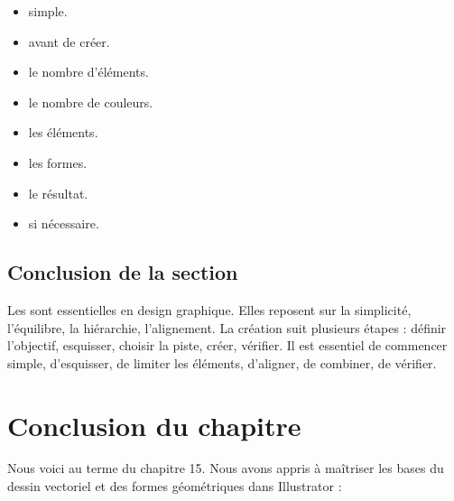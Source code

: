 \begin{itemize}
    \item {} simple.
    \item {} avant de créer.
    \item {} le nombre d'éléments.
    \item {} le nombre de couleurs.
    \item {} les éléments.
    \item {} les formes.
    \item {} le résultat.
    \item {} si nécessaire.
\end{itemize}

\subsection*{Conclusion de la section}

Les  sont essentielles en design graphique. Elles reposent sur la simplicité, l'équilibre, la hiérarchie, l'alignement. La création suit plusieurs étapes : définir l'objectif, esquisser, choisir la piste, créer, vérifier. Il est essentiel de commencer simple, d'esquisser, de limiter les éléments, d'aligner, de combiner, de vérifier.

\section*{Conclusion du chapitre}

Nous voici au terme du chapitre 15. Nous avons appris à maîtriser les bases du dessin vectoriel et des formes géométriques dans Illustrator :

